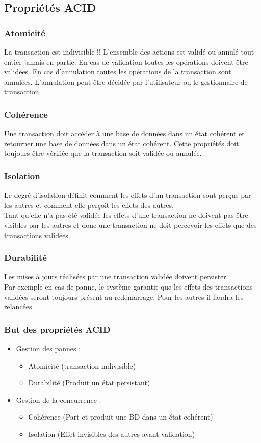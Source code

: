 \documentclass[10pt,a4paper,twoside]{article}
\begin{document}
\subsection{Propriétés ACID}
\subsubsection{Atomicité}
La transaction est indivisible !! L'ensemble des actions est validé ou annulé tout entier jamais en partie. En cas de validation toutes les opérations doivent être validées. En cas d'annulation toutes les opérations de la transaction sont annulées. L'annulation peut être décidée par l'utilisateur ou le gestionnaire de transaction.

\subsubsection{Cohérence}
Une transaction doit accéder à une base de données dans un état cohérent et retourner une base de données dans un état cohérent. Cette propriétés doit toujours être vérifiée que la transaction soit validée ou annulée.

\subsubsection{Isolation}
Le degré d'isolation définit comment les effets d'un transaction sont perçus par les autres et comment elle perçoit les effets des autres.\\
Tant qu'elle n'a pas été validée les effets d'une transaction ne doivent pas être visibles par les autres et donc une transaction ne doit percevoir les effets que des transactions validées.

\subsubsection{Durabilité}
Les mises à jours réalisées par une transaction validée doivent persister.\\
Par exemple en cas de panne, le système garantit que les effets des transactions validées seront toujours présent au redémarrage. Pour les autres il faudra les relancées.

\subsubsection{But des propriétés ACID}
\begin{itemize}
\item Gestion des pannes :
\begin{itemize}
\item Atomicité (transaction indivisible)
\item Durabilité (Produit un état persistant)
\end{itemize}
\item Gestion de la concurrence :
\begin{itemize}
\item Cohérence (Part et produit une BD dans un état cohérent)
\item Isolation (Effet invisibles des autres avant validation)
\end{itemize}
\end{itemize}
\end{document}
